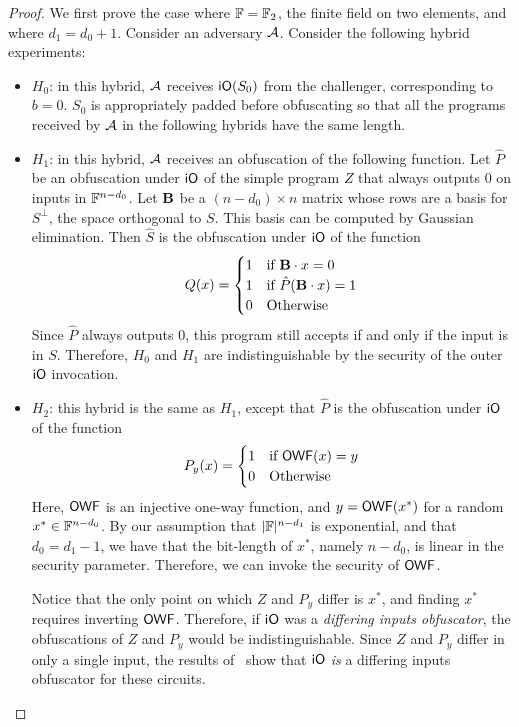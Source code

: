 \begin{proof} We first prove the case where ${\mathbb F}={\mathbb F}_2$, the finite field on two elements, and where $d_1=d_0+1$.  Consider an adversary ${{\mathcal{A}}}$.  Consider the following hybrid experiments:
	\begin{itemize}
		\item $H_0$: in this hybrid, ${{\mathcal{A}}}$ receives ${\sf iO}(S_0)$ from the challenger, corresponding to $b=0$.  $S_0$ is appropriately padded before obfuscating so that all the programs received by ${{\mathcal{A}}}$ in the following hybrids have the same length.
		\item $H_1$: in this hybrid, ${{\mathcal{A}}}$ receives an obfuscation of the following function.  Let $\hat{P}$ be an obfuscation under ${\sf iO}$ of the simple program $Z$ that always outputs 0 on inputs in ${\mathbb F}^{n-d_0}$.  Let ${\mathbf{B}}$ be a $(n-d_0)\times n$ matrix whose rows are a basis for $S^\bot$, the space orthogonal to $S$.  This basis can be computed by Gaussian elimination.  Then $\hat{S}$ is the obfuscation under ${\sf iO}$ of the function 
		\[Q(x)=\begin{cases}1&\text{if }{\mathbf{B}}\cdot x = 0\\1&\text{if }\hat{P}({\mathbf{B}}\cdot x)=1\\0&\text{Otherwise}\end{cases}\]
		Since $\hat{P}$ always outputs 0, this program still accepts if and only if the input is in $S$.  Therefore, $H_0$ and $H_1$ are indistinguishable by the security of the outer ${\sf iO}$ invocation.
		\item $H_2$: this hybrid is the same as $H_1$, except that $\hat{P}$ is the obfuscation under ${\sf iO}$ of the function \[P_y(x)=\begin{cases}1&\text{if }{\sf OWF}(x)=y\\0&\text{Otherwise}\end{cases}\]
		Here, ${\sf OWF}$ is an injective one-way function, and $y={\sf OWF}(x^*)$ for a random $x^*\in{\mathbb F}^{n-d_0}$.  By our assumption that $|{\mathbb F}|^{n-d_1}$ is exponential, and that $d_0=d_1-1$, we have that the bit-length of $x^*$, namely $n-d_0$, is linear in the security parameter.  Therefore, we can invoke the security of ${\sf OWF}$.  
		
		Notice that the only point on which $Z$ and $P_y$ differ is $x^*$, and finding $x^*$ requires inverting ${\sf OWF}$.  Therefore, if ${\sf iO}$ was a \emph{differing inputs obfuscator}, the obfuscations of $Z$ and $P_y$ would be indistinguishable.  Since $Z$ and $P_y$ differ in only a single input, the results of~\cite{TCC:BoyChuPas14} show that ${\sf iO}$ \emph{is} a differing inputs obfuscator for these circuits.  
		

\end{itemize}
\end{proof}
